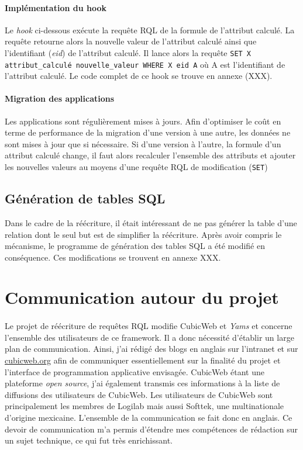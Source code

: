 \documentclass {report}
\begin{document}
\paragraph{Implémentation du hook}
Le \textit{hook} ci-dessous exécute la requête RQL de la formule de l'attribut calculé. La requête retourne alors la nouvelle valeur de l'attribut calculé ainsi que l'identifiant (\textit{eid}) de l'attribut calculé. Il lance alors la requête \verb+SET X attribut_calculé nouvelle_valeur WHERE X eid A+ où A est l'identifiant de l'attribut calculé. Le code complet de ce hook se trouve en annexe (XXX).

\paragraph{Migration des applications}
Les applications sont régulièrement mises à jours. Afin d'optimiser le coût en terme de performance de la migration d'une version à une autre, les données ne sont mises à jour que si nécessaire. Si d'une version à l'autre, la formule d'un attribut calculé change, il faut alors recalculer l'ensemble des attributs et ajouter les nouvelles valeurs au moyens d'une requête RQL de modification (\verb+SET+)

\subsection{Génération de tables SQL}
Dans le cadre de la réécriture, il était intéressant de ne pas générer la table d'une relation dont le seul but est de simplifier la réécriture. Après avoir compris le mécanisme, le programme de génération des tables SQL a été modifié en conséquence. Ces modifications se trouvent en annexe XXX.


\section{Communication autour du projet}
\paragraph{}
Le projet de réécriture de requêtes RQL modifie CubicWeb et \textit{Yams} et concerne l'ensemble des utilisateurs de ce framework. Il a donc nécessité d'établir un large plan de communication. Ainsi, j'ai rédigé des blogs en anglais sur l'intranet et sur \url{cubicweb.org} afin de communiquer essentiellement sur la finalité du projet et l'interface de programmation applicative envisagée. CubicWeb étant une plateforme \textit{open source}, j'ai également transmis ces informations à la liste de diffusions des utilisateurs de CubicWeb. Les utilisateurs de CubicWeb sont principalement les membres de Logilab mais aussi Softtek, une multinationale d'origine mexicaine. L'ensemble de la communication se fait donc en anglais. Ce devoir de communication m'a permis d'étendre mes compétences de rédaction sur un sujet technique, ce qui fut très enrichissant.
\end{document}
